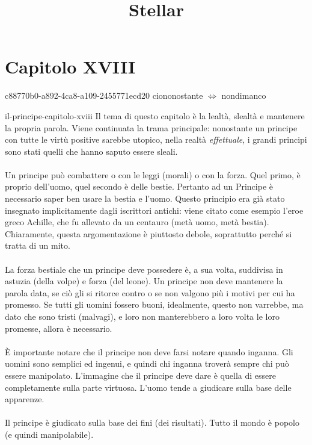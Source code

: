 \documentclass[preview]{standalone}
\begin{document}
\title{Stellar}
\genpage

\section{Capitolo XVIII}

\begin{snippetnote}{c88770b0-a892-4ca8-a109-2455771ecd20}{}
    ciononostante \(\iff\) nondimanco
\end{snippetnote}

\begin{snippet}{il-principe-capitolo-xviii}
    Il tema di questo capitolo è la lealtà, slealtà e mantenere
    la propria parola.
    Viene continuata la trama principale:
    nonostante un principe con tutte le virtù positive
    sarebbe utopico, nella realtà \textit{effettuale},
    i grandi principi sono stati quelli che hanno saputo essere sleali.
    \\\\
    Un principe può combattere o con le leggi (morali)
    o con la forza. Quel primo, è proprio dell'uomo, quel secondo
    è delle bestie.
    Pertanto ad un Principe è necessario saper ben usare la bestia e l'uomo.
    Questo principio era già stato insegnato implicitamente dagli iscrittori antichi:
    viene citato come esempio l'eroe greco Achille, che fu allevato
    da un centauro (metà uomo, metà bestia).
    Chiaramente, questa argomentazione è piuttosto debole,
    soprattutto perché si tratta di un mito.
    \\\\
    La forza bestiale che un principe deve possedere è, a sua volta,
    suddivisa in astuzia (della volpe) e forza (del leone).
    Un principe non deve mantenere la parola data, se ciò
    gli si ritorce contro o se non valgono più i motivi per cui ha promesso.
    Se tutti gli uomini fossero buoni, idealmente, questo non varrebbe,
    ma dato che sono tristi (malvagi), e loro non manterebbero
    a loro volta le loro promesse, allora è necessario.
    \\\\
    È importante notare che il principe non deve farsi notare
    quando inganna. Gli uomini sono semplici ed ingenui, e quindi
    chi inganna troverà sempre chi può essere manipolato.
    L'immagine che il principe deve dare
    è quella di essere completamente sulla parte virtuosa.
    L'uomo tende a giudicare sulla base delle apparenze.
    \\\\
    Il principe è giudicato sulla base dei fini (dei risultati).
    Tutto il mondo è popolo (e quindi manipolabile).
\end{snippet}
\end{document}
